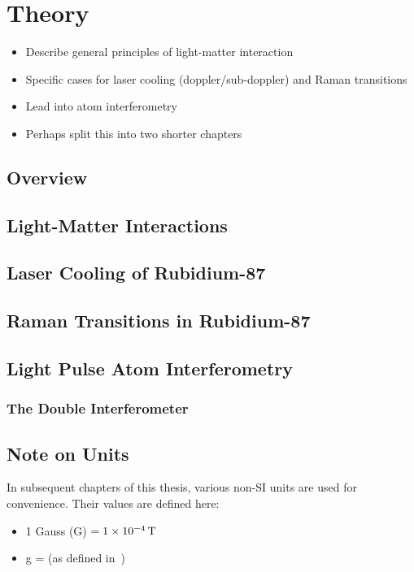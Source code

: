 \chapter{Theory}\label{chap:theory}
\begin{itemize}
    \item Describe general principles of light-matter interaction
    \item Specific cases for laser cooling (doppler/sub-doppler) and Raman transitions 
    \item Lead into atom interferometry
    \item Perhaps split this into two shorter chapters 
\end{itemize}
\section{Overview}\label{sec:theory_overview}
\section{Light-Matter Interactions}\label{sec:theory_lmi}
\section{Laser Cooling of Rubidium-87}
\section{Raman Transitions in Rubidium-87}\label{sec:theory_raman}
\section{Light Pulse Atom Interferometry}\label{sec:theory_atomint}
\subsection{The Double Interferometer}\label{sec:theory_double_int}


\section{Note on Units}
In subsequent chapters of this thesis, various non-SI units are used for convenience. Their values are defined here:
\begin{itemize}
    \item 1 Gauss (G) \(= \sivalue{1e-4}{\tesla}\)
    \item g =  (as defined in~\cite{})
\end{itemize}